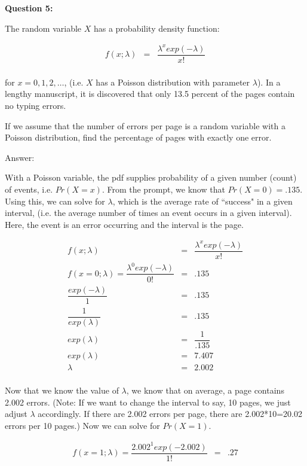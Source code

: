 \documentclass[11pt]{article}
\begin{document}
\textbf{Question 5:}

The random variable $X$ has a probability density function:

\begin{eqnarray*}
f(x; \lambda)&=&\dfrac{\lambda^x exp(- \lambda)}{x!}\\
\end{eqnarray*}

for $x = 0,1,2,\ldots$, (i.e. $X$ has a Poisson distribution with parameter $\lambda$). In a lengthy manuscript, it is discovered that only 13.5 percent of the pages contain no typing errors. 


\bigskip
If we assume that the number of errors per page is a random variable with a Poisson distribution, find the percentage of pages with exactly one error. 

\bigskip
Answer:


With a Poisson variable, the pdf supplies probability of a given number (count) of events, i.e. $Pr(X=x)$. From the prompt, we know that $Pr(X=0) = .135$. Using this, we can solve for $\lambda$, which is the average rate of ``success" in a given interval, (i.e. the average number of times an event occurs in a given interval). Here, the event is an error occurring and the interval is the page. 

\begin{eqnarray*}
f(x; \lambda)&=&\dfrac{\lambda^x exp(- \lambda)}{x!}\\
f(x=0; \lambda)=\dfrac{\lambda^0 exp(- \lambda)}{0!} &=& .135\\
\dfrac{exp(- \lambda)}{1} &=& .135\\
\dfrac{1}{exp( \lambda)} &=& .135\\
exp( \lambda) &=& \dfrac{1}{.135}\\
exp( \lambda) &=& 7.407\\
 \lambda &=& 2.002\\
\end{eqnarray*}


 Now that we know the value of $\lambda$, we know that on average, a page contains 2.002 errors. (Note: If we want to change the interval to say, 10 pages, we just adjust $\lambda$ accordingly. If there are 2.002 errors per page, there are 2.002*10=20.02 errors per 10 pages.) Now we can solve for $Pr(X=1)$. 

\begin{eqnarray*}
f(x=1; \lambda)=\dfrac{2.002^1 exp(- 2.002)}{1!} &=& .27\\
\end{eqnarray*}
\end{document}
